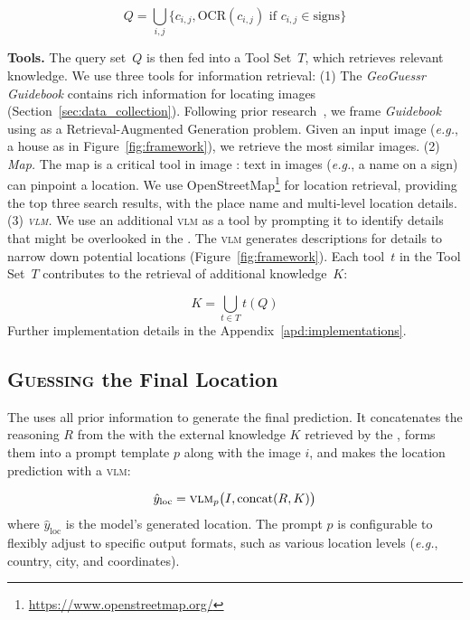 \vspace{-5pt}
\[
Q = \bigcup_{i,j} \{ c_{i,j}, \text{OCR}(c_{i,j}) \text{ if } c_{i,j} \in \text{signs} \}
\]


\textbf{Tools.} The query set~\( Q \) is then fed into a Tool Set~\( T \), which retrieves relevant knowledge. We use three tools for information retrieval: 
(1) The \textit{GeoGuessr Guidebook} contains rich information for locating images (Section~\ref{sec:data_collection}). Following prior research~\cite{luo2022g, zhou2024img2loc}, we frame \textit{Guidebook} using as a Retrieval-Augmented Generation problem. Given an input image (\textit{e.g.}, a house as in Figure~\ref{fig:framework}), we retrieve the most similar images. 
(2) \textit{Map.} The map is a critical tool in image \geoloc: text in images (\textit{e.g.}, a name on a sign) can pinpoint a location. We use OpenStreetMap\footnote{\url{https://www.openstreetmap.org/}} for location retrieval, providing the top three search results, with the place name and multi-level location details.
(3) \textit{\textsc{vlm}.} We use an additional \textsc{vlm} as a tool by prompting it to identify details that might be overlooked in the \macname. The \textsc{vlm} generates descriptions for details to narrow down potential locations (Figure~\ref{fig:framework}). Each tool~\( t \) in the Tool Set~\( T \) contributes to the retrieval of additional knowledge~\( K \): 

\vspace{-5pt}
\[
K = \bigcup_{t \in T} t(Q)
\]
Further implementation details in the Appendix~\ref{apd:implementations}.

\subsection{\textsc{Guessing} the Final Location}
\label{sec:guesser}
The \guessname uses all prior information to generate the final prediction. It concatenates the reasoning $R$ from the \macname with the external knowledge $K$ retrieved by the \micname, forms them into a prompt template $p$ along with the image $i$, and makes the location prediction with a \textsc{vlm}:

\vspace{-5pt}
\[
\hat{y}_{\text{loc}} = \mathrm{\textsc{vlm}}_{p} \big( I, \mathrm{concat}(R, K) \big)
\]
where $\hat{y}_{\text{loc}}$ is the model's generated location. The prompt $p$ is configurable to flexibly adjust to specific output formats, such as various location levels (\textit{e.g.}, country, city, and coordinates).